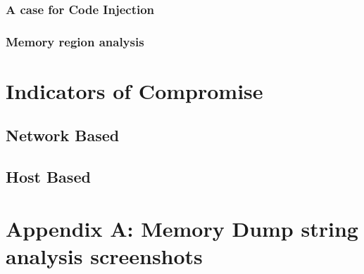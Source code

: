 \documentclass[10pt,a4paper]{article}
\begin{document}
				\subsubsection{A case for Code Injection}
				\subsubsection{Memory region analysis}

\section{Indicators of Compromise}
			\subsection{Network Based}
			\subsection{Host Based}

\newpage
\section{Appendix A: Memory Dump string analysis screenshots}

\newpage
\printbibliography
\end{document}
